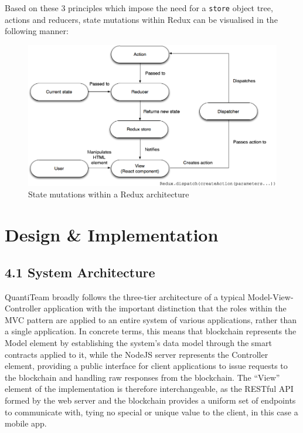 Based on these 3 principles which impose the need for a \texttt{store}
object tree, actions and reducers, state mutations within Redux can be
visualised in the following manner:

\begin{figure}[htbp]
\centering
\includegraphics{../diagrams/redux.png}
\caption{State mutations within a Redux architecture\cite{1reduxibm}}
\end{figure}

\clearpage

\chapter{Design \& Implementation}

\section{4.1 System Architecture}\label{system-architecture}

QuantiTeam broadly follows the three-tier architecture of a typical
Model-View-Controller\cite{krasner1988description} application with the important distinction that the
roles within the MVC pattern are applied to an entire system of various
applications, rather than a single application. In concrete terms, this
means that blockchain represents the Model element by establishing the
system's data model through the smart contracts applied to it, while the
NodeJS server represents the Controller element, providing a public
interface for client applications to issue requests to the blockchain
and handling raw responses from the blockchain. The ``View'' element of
the implementation is therefore interchangeable, as the RESTful API
formed by the web server and the blockchain provides a uniform set of
endpoints to communicate with, tying no special or unique value to the
client, in this case a mobile app.

